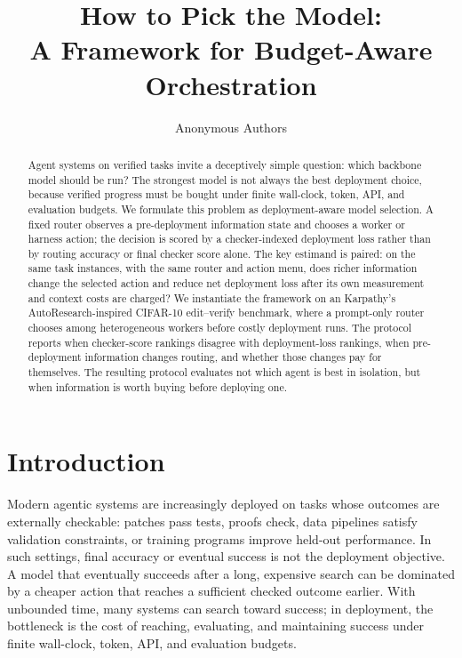 \documentclass{article}
\title{How to Pick the Model:\\
A Framework for Budget-Aware Orchestration}
\author{Anonymous Authors}
\begin{document}
\maketitle

\begin{abstract}
Agent systems on verified tasks invite a deceptively simple question: which backbone model should be run? 
The strongest model is not always the best deployment choice, because verified progress must be bought under finite wall-clock, token, API, and evaluation budgets. 
We formulate this problem as deployment-aware model selection. 
A fixed router observes a pre-deployment information state and chooses a worker or harness action; the decision is scored by a checker-indexed deployment loss rather than by routing accuracy or final checker score alone. 
The key estimand is paired: on the same task instances, with the same router and action menu, does richer information change the selected action and reduce net deployment loss after its own measurement and context costs are charged? 
We instantiate the framework on an Karpathy's AutoResearch-inspired CIFAR-10 edit--verify benchmark, where a prompt-only router chooses among heterogeneous workers before costly deployment runs. 
The protocol reports when checker-score rankings disagree with deployment-loss rankings, when pre-deployment information changes routing, and whether those changes pay for themselves. 
The resulting protocol evaluates not which agent is best in isolation, but when information is worth buying before deploying one.
\end{abstract}

\section{Introduction}
\label{sec:intro}

Modern agentic systems are increasingly deployed on tasks whose outcomes are externally checkable: patches pass tests, proofs check, data pipelines satisfy validation constraints, or training programs improve held-out performance.
In such settings, final accuracy or eventual success is not the deployment objective.
A model that eventually succeeds after a long, expensive search can be dominated by a cheaper action that reaches a sufficient checked outcome earlier.
With unbounded time, many systems can search toward success; in deployment, the bottleneck is the cost of reaching, evaluating, and maintaining success under finite wall-clock, token, API, and evaluation budgets.
\end{document}
